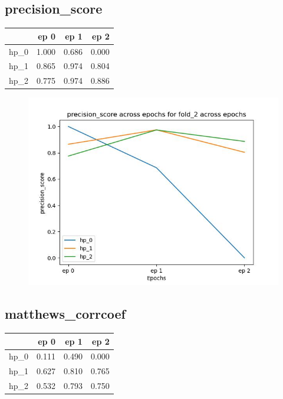 \documentclass{article}
\begin{document}
\subsection{precision\_score}
\begin{tabular}{lrrr}
\toprule
{} &   ep 0 &   ep 1 &   ep 2 \\
\midrule
hp\_0 &  1.000 &  0.686 &  0.000 \\
hp\_1 &  0.865 &  0.974 &  0.804 \\
hp\_2 &  0.775 &  0.974 &  0.886 \\
\bottomrule
\end{tabular}

\begin{figure}[H]
\includegraphics[scale = 0.75]{fold_2/precision_score}
\end{figure}
\subsection{matthews\_corrcoef}
\begin{tabular}{lrrr}
\toprule
{} &   ep 0 &   ep 1 &   ep 2 \\
\midrule
hp\_0 &  0.111 &  0.490 &  0.000 \\
hp\_1 &  0.627 &  0.810 &  0.765 \\
hp\_2 &  0.532 &  0.793 &  0.750 \\
\bottomrule
\end{tabular}
\end{document}
